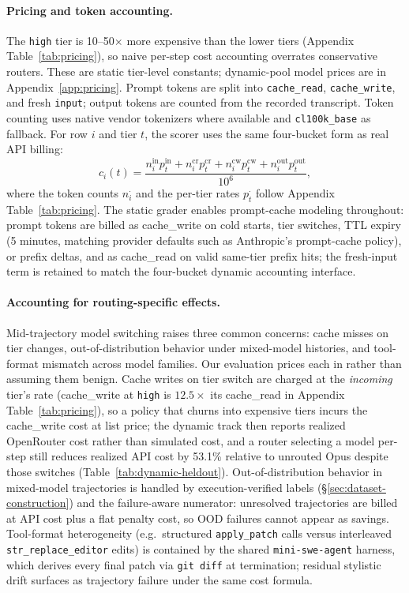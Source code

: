 \paragraph{Pricing and token accounting.}
The \texttt{high} tier is 10--50$\times$ more expensive than the lower tiers
(Appendix Table~\ref{tab:pricing}), so naive per-step cost accounting overrates
conservative routers. These are static tier-level constants; dynamic-pool
model prices are in Appendix~\ref{app:pricing}. Prompt tokens are split into
\texttt{cache\_read}, \texttt{cache\_write}, and fresh \texttt{input}; output
tokens are counted from the recorded transcript. Token counting uses native
vendor tokenizers where available and \texttt{cl100k\_base} as fallback. For
row $i$ and tier $t$, the scorer uses the same four-bucket form as real API
billing:
\[
c_i(t)=
\frac{
n_i^{\mathrm{in}}p_t^{\mathrm{in}}+
n_i^{\mathrm{cr}}p_t^{\mathrm{cr}}+
n_i^{\mathrm{cw}}p_t^{\mathrm{cw}}+
n_i^{\mathrm{out}}p_t^{\mathrm{out}}
}{10^6},
\]
where the token counts $n_i^{\cdot}$ and the per-tier rates $p_t^{\cdot}$
follow Appendix Table~\ref{tab:pricing}. The static grader enables prompt-cache
modeling throughout: prompt tokens are billed as cache\_write on cold starts,
tier switches, TTL expiry (5 minutes, matching provider defaults such as
Anthropic's prompt-cache policy), or prefix deltas, and as cache\_read on
valid same-tier prefix hits; the fresh-input term is retained to match the
four-bucket dynamic accounting interface.

\paragraph{Accounting for routing-specific effects.}
Mid-trajectory model switching raises three common concerns: cache misses on
tier changes, out-of-distribution behavior under mixed-model histories, and
tool-format mismatch across model families. Our evaluation prices each in
rather than assuming them benign. Cache writes on tier switch are charged
at the \emph{incoming} tier's rate (cache\_write at \texttt{high} is
$12.5\times$ its cache\_read in Appendix Table~\ref{tab:pricing}), so a policy that
churns into expensive tiers incurs the cache\_write cost at list price; the dynamic
track then reports realized OpenRouter cost rather than simulated cost, and a
router selecting a model per-step still reduces realized API cost by 53.1\%
relative to unrouted Opus despite those switches
(Table~\ref{tab:dynamic-heldout}). Out-of-distribution behavior in mixed-model
trajectories is handled by execution-verified labels
(\S\ref{sec:dataset-construction}) and the failure-aware numerator: unresolved
trajectories are billed at API cost plus a flat penalty cost, so OOD
failures cannot appear as savings. Tool-format heterogeneity
(e.g.\ structured \texttt{apply\_patch} calls versus interleaved
\texttt{str\_replace\_editor} edits) is contained by the shared
\texttt{mini-swe-agent} harness, which derives every final patch via
\texttt{git diff} at termination; residual stylistic drift surfaces as
trajectory failure under the same cost formula.

